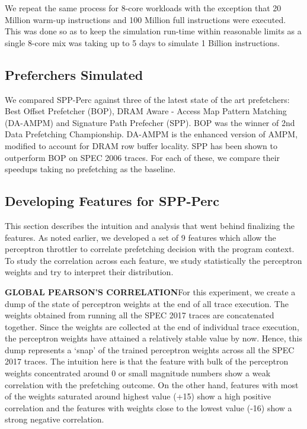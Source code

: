 We repeat the same process for 8-core workloads with the exception
that 20 Million warm-up instructions and 100 Million full instructions
were executed.  This was done so as to keep the simulation run-time
within reasonable limits as a single 8-core mix was taking up to 5
days to simulate 1 Billion instructions.

\subsection{Preferchers Simulated}
We compared SPP-Perc against three of the latest state of the art
prefetchers: Best Offset Prefetcher (BOP), DRAM Aware - Access Map
Pattern Matching (DA-AMPM)\cite{DA_AMPM} and Signature Path Prefecher
(SPP).  BOP was the winner of 2nd Data Prefetching Championship.
DA-AMPM is the enhanced version of AMPM, modified to account for DRAM
row buffer locality.  SPP has been shown to outperform BOP on SPEC
2006 traces.  For each of these, we compare their speedups taking no
prefetching as the baseline.


\subsection{Developing Features for SPP-Perc}
This section describes the intuition and analysis that went behind
finalizing the features.  As noted earlier, we developed a set of 9
features which allow the perceptron throttler to correlate prefetching
decision with the program context.  To study the correlation across
each feature, we study statistically the perceptron weights and try to
interpret their distribution.

\textbf{GLOBAL PEARSON'S CORRELATION}\newline For this experiment, we
create a dump of the state of perceptron weights at the end of all
trace execution.  The weights obtained from running all the SPEC 2017
traces are concatenated together.  Since the weights are collected at
the end of individual trace execution, the perceptron weights have
attained a relatively stable value by now.  Hence, this dump
represents a `snap' of the trained perceptron weights across all the
SPEC 2017 traces.  The intuition here is that the feature with bulk of
the perceptron weights concentrated around 0 or small magnitude
numbers show a weak correlation with the prefetching outcome.  On the
other hand, features with most of the weights saturated around highest
value (+15) show a high positive correlation and the features with
weights close to the lowest value (-16) show a strong negative
correlation.

